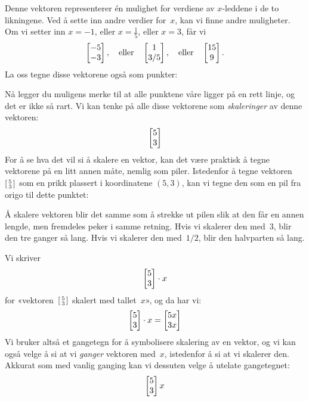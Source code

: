 Denne vektoren representerer én mulighet for verdiene av $x$-leddene i
de to likningene.  Ved å sette inn andre verdier for~$x$, kan vi finne
andre muligheter.  Om vi setter inn $x=-1$, eller $x=\frac{1}{5}$,
eller $x=3$, får vi
\[
\begin{bmatrix} -5 \\ -3 \end{bmatrix},\quad\text{eller}\quad
\begin{bmatrix} 1 \\ 3/5 \end{bmatrix},\quad\text{eller}\quad
\begin{bmatrix} 15 \\ 9 \end{bmatrix}.
\]
La oss tegne disse vektorene også som punkter:
\begin{center}
\end{center}
Nå legger du muligens merke til at alle punktene våre ligger på en
rett linje, og det er ikke så rart.  Vi kan tenke på alle disse
vektorene som \emph{skaleringer} av denne vektoren:
\[
\begin{bmatrix} 5 \\ 3 \end{bmatrix}
\]
For å se hva det vil si å skalere en vektor, kan det være praktisk å
tegne vektorene på en litt annen måte, nemlig som piler.  Istedenfor å
tegne vektoren~$\left[ \begin{smallmatrix} 5 \\ 3 \end{smallmatrix} \right]$ som en prikk plassert i koordinatene
$(5,3)$, kan vi tegne den som en pil fra origo til dette punktet:
\begin{center}
\end{center}
Å skalere vektoren blir det samme som å strekke ut pilen slik at den
får en annen lengde, men fremdeles peker i samme retning.  Hvis vi
skalerer den med~$3$, blir den tre ganger så lang.  Hvis vi skalerer
den med~$1/2$, blir den halvparten så lang.

Vi skriver
\[
\begin{bmatrix} 5 \\ 3 \end{bmatrix} \cdot x
\]
for «vektoren~$\left[ \begin{smallmatrix} 5 \\ 3 \end{smallmatrix} \right]$ skalert med tallet~$x$», og da har vi:
\[
\begin{bmatrix} 5 \\ 3 \end{bmatrix} \cdot x = \begin{bmatrix} 5x \\ 3x \end{bmatrix}
\]
Vi bruker altså et gangetegn for å symbolisere skalering av en vektor,
og vi kan også velge å si at vi \emph{ganger} vektoren med~$x$,
istedenfor å si at vi skalerer den.  Akkurat som med vanlig ganging
kan vi dessuten velge å utelate gangetegnet:
\[
\begin{bmatrix} 5 \\ 3 \end{bmatrix} x
\]

